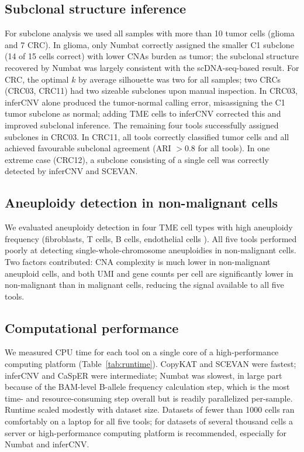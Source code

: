 \documentclass[11pt]{article}
\begin{document}
\subsection{Subclonal structure inference}
For subclone analysis we used all samples with more than 10 tumor cells (glioma and 7 CRC). In glioma, only Numbat correctly assigned the smaller C1 subclone (14 of 15 cells correct) with lower CNAs burden as tumor; the subclonal structure recovered by Numbat was largely consistent with the scDNA-seq-based result. For CRC, the optimal $k$ by average silhouette was two for all samples; two CRCs (CRC03, CRC11) had two sizeable subclones upon manual inspection. In CRC03, inferCNV alone produced the tumor-normal calling error, misassigning the C1 tumor subclone as normal; adding TME cells to inferCNV corrected this and improved subclonal inference. The remaining four tools successfully assigned subclones in CRC03. In CRC11, all tools correctly classified tumor cells and all achieved favourable subclonal agreement (ARI $>0.8$ for all tools). In one extreme case (CRC12), a subclone consisting of a single cell was correctly detected by inferCNV and SCEVAN.

\subsection{Aneuploidy detection in non-malignant cells}
We evaluated aneuploidy detection in four TME cell types with high aneuploidy frequency (fibroblasts, T cells, B cells, endothelial cells \citep{zhou2023crc}). All five tools performed poorly at detecting single-whole-chromosome aneuploidies in non-malignant cells. Two factors contributed: CNA complexity is much lower in non-malignant aneuploid cells, and both UMI and gene counts per cell are significantly lower in non-malignant than in malignant cells, reducing the signal available to all five tools.

\subsection{Computational performance}
We measured CPU time for each tool on a single core of a high-performance computing platform (Table~\ref{tab:runtime}). CopyKAT and SCEVAN were fastest; inferCNV and CaSpER were intermediate; Numbat was slowest, in large part because of the BAM-level B-allele frequency calculation step, which is the most time- and resource-consuming step overall but is readily parallelized per-sample. Runtime scaled modestly with dataset size. Datasets of fewer than 1000 cells ran comfortably on a laptop for all five tools; for datasets of several thousand cells a server or high-performance computing platform is recommended, especially for Numbat and inferCNV.
\end{document}
